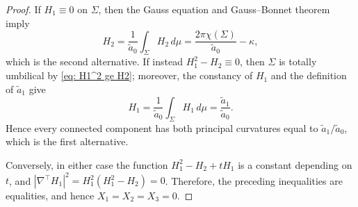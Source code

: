 \documentclass[11pt]{amsart}
\theoremstyle{definition}
\numberwithin{equation}{section}
\begin{document}
\begin{proof}
   If $H_1\equiv0$ on $\Sigma$, then the Gauss equation and Gauss--Bonnet theorem imply
   \[
   H_2=\frac{1}{\tilde a_0}\int_\Sigma H_2\,d\mu
   =\frac{2\pi\chi(\Sigma)}{\tilde a_0}-\kappa,
   \]
   which is the second alternative. If instead $H_1^2-H_2\equiv0$, then $\Sigma$ is totally umbilical by \eqref{eq: H1^2 ge H2}; moreover, the constancy of $H_1$ and the definition of $\tilde a_1$ give
   \[
   H_1=\frac{1}{\tilde a_0}\int_\Sigma H_1\,d\mu=\frac{\tilde a_1}{\tilde a_0}.
   \]
   Hence every connected component has both principal curvatures equal to $\tilde a_1/\tilde a_0$, which is the first alternative. 
   
   Conversely, in either case the function $H_1^2 - H_2 + tH_1$ is a constant depending on $t$, and $|\nabla^\top H_1|^2 = H_1^2(H_1^2 - H_2) = 0$. Therefore, the preceding inequalities are equalities, and hence $X_1 = X_2 = X_3=0$.
\end{proof}
      
\end{document}
